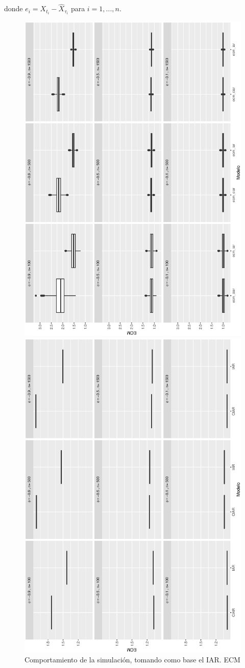 donde $e_i = X_{t_i} - \hat{X}_{\tau_i}$ para $i = 1, ..., n$.
\begin{figure}[h]
    \begin{minipage}{0.45\textwidth}
    \includegraphics[width=0.75\linewidth,angle = 270]{Kap3/Fig_Cap3/sim4_IARvsCIAR.eps}
    \caption{Comportamiento de la simulación, tomando como base el IAR. ECM}
    \label{fig:iarvsciar}
    \end{minipage}
    \hfill
    \begin{minipage}{0.45\textwidth}
    \includegraphics[width=0.75\linewidth,angle = 270]{Kap3/Fig_Cap3/sim4_CIARvsIAR.eps}

\end{minipage}
\end{figure}
